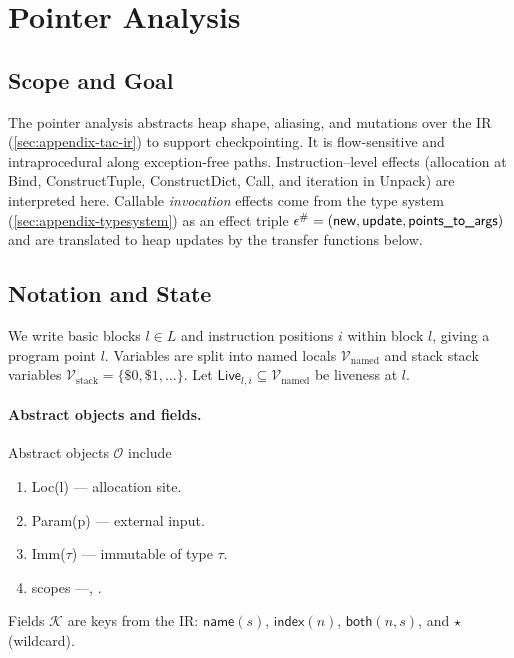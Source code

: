 \newpage
\section{Pointer Analysis}
\label{sec:appendix-pointer}

\subsection{Scope and Goal}

The pointer analysis abstracts heap shape, aliasing, and mutations over the \spytecode IR
(\autoref{sec:appendix-tac-ir}) to support checkpointing. It is
flow-sensitive and intraprocedural along exception-free paths.
Instruction–level effects (allocation at \textsf{Bind}, \textsf{ConstructTuple},
\textsf{ConstructDict}, \textsf{Call}, and iteration in \textsf{Unpack}) are interpreted here.
Callable \emph{invocation} effects come from the type system
(\autoref{sec:appendix-typesystem}) as an effect triple
\(\epsilon^\#=(\textsf{new},\textsf{update},\textsf{points\_to\_args})\) and are translated to
heap updates by the transfer functions below.

\subsection{Notation and State}

We write basic blocks \(l\in L\) and instruction positions \(i\) within block \(l\), giving a
program point \(l\).
Variables are split into named locals \(\mathcal{V}_{\mathrm{named}}\) and stack stack variables
\(\mathcal{V}_{\mathrm{stack}}=\{\$0,\$1,\ldots\}\).
Let \(\mathsf{Live}_{l,i}\subseteq \mathcal{V}_{\mathrm{named}}\) be liveness at \(l\).

\paragraph{Abstract objects and fields.}
Abstract objects \(\mathcal{O}\) include
\begin{enumerate}
    \item \textsf{Loc}(l) --- allocation site.
    \item \textsf{Param}(p) --- external input.
    \item \textsf{Imm}($\tau$) --- immutable of type $\tau$.
    \item scopes ---\tLOCALS, \tGLOBALS.
\end{enumerate}

Fields \(\mathcal{K}\) are keys from the IR:
\(\mathsf{name}(s)\), \(\mathsf{index}(n)\), \(\mathsf{both}(n,s)\), and \(\star\) (wildcard).

